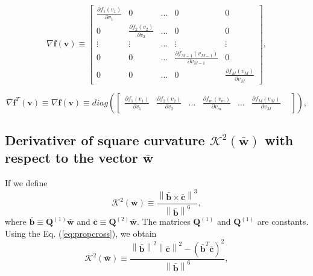 \begin{equation}
\nabla\mathbf{f}(\mathbf{v}) 
\equiv
\begin{bmatrix}
\frac{\partial f_{1}(v_{1})}{\partial v_{1}} & 0  & \dots & 0      & 0\\
0  & \frac{\partial f_{2}(v_{2})}{\partial v_{2}} & \dots & 0      & 0\\
\vdots                  & \vdots                  & \dots & \vdots & \vdots\\
0                       & 0                       & \dots & \frac{\partial f_{M-1}(v_{M-1})}{\partial v_{M-1}} & 0\\
0                       & 0                       & \dots & 0      & \frac{\partial f_{M}(v_{M})}{\partial v_{M}}
\end{bmatrix},
\end{equation}

\begin{equation}
\nabla \mathbf{f}^{T}(\mathbf{v}) 
\equiv
\nabla \mathbf{f}(\mathbf{v}) 
\equiv
diag
\left(
\begin{bmatrix}
\frac{\partial f_{1}(v_{1})}{\partial v_{1}} &
\frac{\partial f_{2}(v_{2})}{\partial v_{2}} &
\dots&
\frac{\partial f_{m}(v_{m})}{\partial v_{m}} &
\dots&
\frac{\partial f_{M}(v_{M})}{\partial v_{M}} &
\end{bmatrix}
\right),
\end{equation}

\subsection{Derivativer of square curvature $\mathcal{K}^{2}(\mathbf{\bar{w}})$ with respect to the vector $\mathbf{\bar{w}}$}
If we define
\begin{equation}
\mathcal{K}^{2}(\mathbf{\bar{w}})
\equiv
\frac{\left\| \mathbf{\bar{b}} \times \mathbf{\bar{c}} \right\|^{3}}{\left\| \mathbf{\bar{b}} \right\|^{6}},
\end{equation}
where $\mathbf{\bar{b}} \equiv \mathbf{Q}^{(1)} \mathbf{\bar{w}}$ and $\mathbf{\bar{c}} \equiv \mathbf{Q}^{(2)} \mathbf{\bar{w}}$. The matrices $\mathbf{Q}^{(1)}$ and $\mathbf{Q}^{(1)}$ are constants. 
Using the Eq. (\ref{eq:propcross}), we obtain
\begin{equation}
\mathcal{K}^{2}(\mathbf{\bar{w}})
\equiv
\frac{
\left\|
\mathbf{\bar{b}} 
\right\|^{2}
\left\|
\mathbf{\bar{c}}
\right\|^{2}
-
\left(
\mathbf{\bar{b}}^{T}
\mathbf{\bar{c}}
\right)^{2}
}
{\left\| \mathbf{\bar{b}} \right\|^{6}},
\end{equation}

